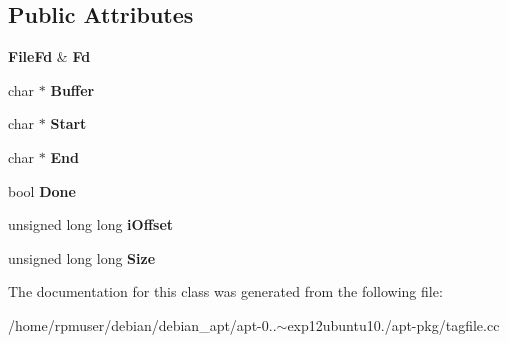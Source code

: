 \subsection*{\-Public \-Attributes}
\begin{DoxyCompactItemize}
\item 
{\bf \-File\-Fd} \& {\bfseries \-Fd}\label{classpkgTagFilePrivate_a8e882281c79416d5527c21567d30ae53}

\item 
char $\ast$ {\bfseries \-Buffer}\label{classpkgTagFilePrivate_ad1bb1e1f60b391156e2a18c4a7fe6033}

\item 
char $\ast$ {\bfseries \-Start}\label{classpkgTagFilePrivate_aa97b3b87588dad2b1b2ebc2d7b7ca2b5}

\item 
char $\ast$ {\bfseries \-End}\label{classpkgTagFilePrivate_a9cb64b868554b25cadb1ebc5681b5d04}

\item 
bool {\bfseries \-Done}\label{classpkgTagFilePrivate_ac3fdeca3b63101bb46822fca80eacc18}

\item 
unsigned long long {\bfseries i\-Offset}\label{classpkgTagFilePrivate_a229bddc27ab737c317251c25fbfc9da1}

\item 
unsigned long long {\bfseries \-Size}\label{classpkgTagFilePrivate_a254f9ca5c1e1232788dedebd142044aa}

\end{DoxyCompactItemize}


\-The documentation for this class was generated from the following file\-:\begin{DoxyCompactItemize}
\item 
/home/rpmuser/debian/debian\-\_\-apt/apt-\/0..$\sim$exp12ubuntu10./apt-\/pkg/tagfile.\-cc\end{DoxyCompactItemize}
